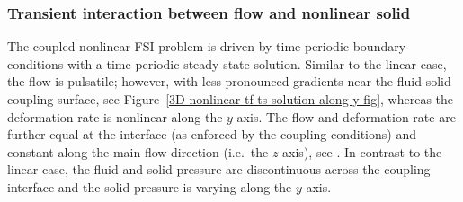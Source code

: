 \documentclass[3p]{elsarticle}
\begin{document}
\subsubsection{Transient interaction between flow and nonlinear solid}
\label{results-nonlinear-fsi}
The coupled nonlinear FSI problem is driven by time-periodic boundary conditions
with a time-periodic steady-state solution.
Similar to the linear case, the flow is pulsatile;
however, with less pronounced gradients near the fluid-solid coupling surface,
see Figure~\ref{3D-nonlinear-tf-ts-solution-along-y-fig},
whereas the deformation rate is nonlinear along the $y$-axis.
The flow and deformation rate are further equal at the interface
(as enforced by the coupling conditions)
and constant along the main flow direction (i.e.\ the $z$-axis),
see \cite{HessenthalerBalmusRoehrleNordsletten2020}.
In contrast to the linear case,
the fluid and solid pressure are discontinuous across the coupling interface
and the solid pressure is varying along the $y$-axis.
\FloatBarrier
\end{document}
